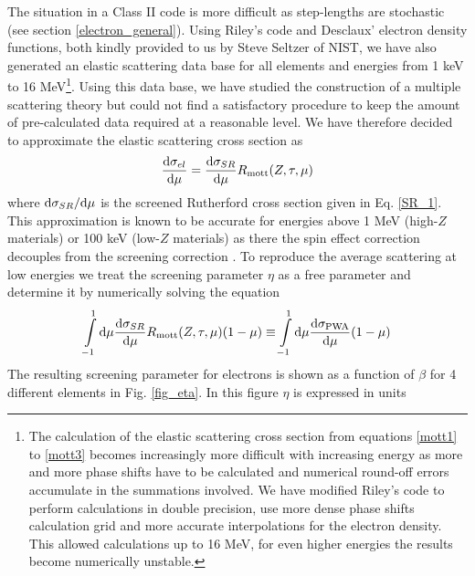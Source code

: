 The situation in a Class II code is more difficult as step-lengths 
are stochastic (see section \ref{electron_general}). 
Using Riley's code and Desclaux' electron 
density functions, both kindly provided to us by Steve Seltzer of NIST, 
we have also generated an elastic scattering data 
base for all elements and energies from 1 keV to 16 MeV\footnote{
The calculation of the elastic scattering cross section from 
equations \eqref{mott1} to \eqref{mott3} becomes increasingly 
more difficult with increasing energy as more and more phase 
shifts have to be calculated and numerical round-off errors 
accumulate in the summations involved. We have modified Riley's 
code to perform calculations in double precision, use more dense phase 
shifts calculation grid and more accurate interpolations for 
the electron density. This allowed calculations up to 16 MeV, for 
even higher energies the results become numerically unstable.}.
Using this data base, we have studied the construction of a multiple 
scattering theory but could not find a satisfactory procedure 
to keep the amount of pre-calculated data required at a reasonable level. 
We have therefore decided to approximate the elastic scattering 
cross section as
\begin{equation}
\label{sigma_el}
{{\rm d}\sigma_{el} \over {\rm d}\mu} = {{\rm d}\sigma_{SR} \over {\rm d}\mu} 
R_{\rm mott}(Z,\tau,\mu)
\end{equation}
where ${\rm d}\sigma_{SR}/{\rm d}\mu$ is the screened Rutherford cross 
section given in Eq. \eqref{SR_1}. This approximation is known 
to be accurate for energies above 1 MeV (high-$Z$ materials) or 
100 keV (low-$Z$ materials) as there the spin effect correction 
decouples from the screening correction \cite{BW89}. To 
reproduce the average scattering at low energies we treat 
the screening parameter $\eta$ as a free parameter and determine 
it by numerically solving the equation
\begin{equation}
\label{fix_eta}
\int\limits_{-1}^1 {\rm d} \mu {{\rm d}\sigma_{SR} \over {\rm d}\mu}  
R_{\rm mott}(Z,\tau,\mu) (1 - \mu) \equiv 
\int\limits_{-1}^1 {\rm d} \mu {{\rm d}\sigma_{\rm PWA} \over {\rm d} \mu} 
(1 - \mu) 
\end{equation}
The resulting screening parameter for electrons is shown 
as a function of $\beta$ for 4 different elements in 
Fig. \ref{fig_eta}. In this figure $\eta$ is expressed in units 
